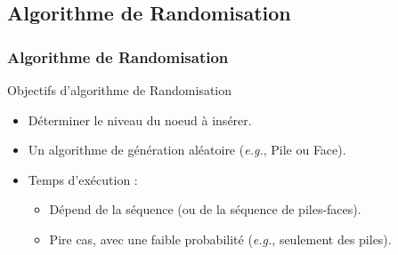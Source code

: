 \documentclass{beamer}
\begin{document}
\subsection{Algorithme de Randomisation}
{
\begin{frame}	
	\frametitle{Algorithme de Randomisation}
	
	\begin{block}{Objectifs d'algorithme de Randomisation \cite{ArticleHamel}} 
		~\\[.4cm]
	\begin{itemize}		
		\item Déterminer le niveau du noeud à insérer.\\[.4cm]
		\item Un algorithme de génération aléatoire (\textit{e.g.}, Pile ou Face).\\[.4cm]
		\item Temps d’exécution : 
		\begin{itemize} 
			\item Dépend de la séquence (ou de la séquence de piles-faces).\\[.4cm]
			\item Pire cas, avec une faible probabilité (\textit{e.g.}, seulement des piles).
		\end{itemize}
	\end{itemize}
		~\\[.4cm]
	\end{block}				
		
\end{frame}	
}

\end{document}

